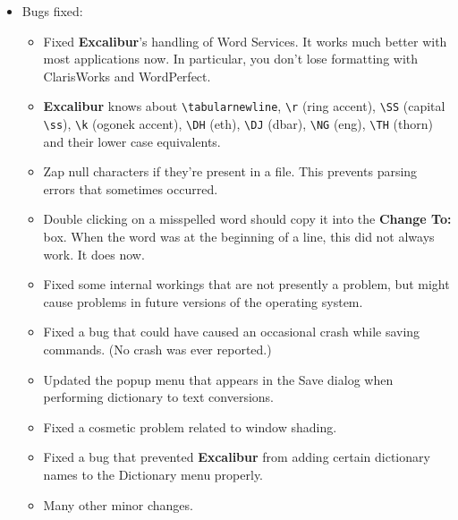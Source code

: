 ﻿\documentclass[11pt,titlepage]{article}
\newcommand{\ex}{\textbf{Excalibur}}
\begin{document}
\begin{itemize}

\item Bugs fixed:

  \begin{itemize}

  \item Fixed \ex's handling of Word Services.  It works much better
    with most applications now.  In particular, you don't lose
    formatting with ClarisWorks and WordPerfect.

  \item \ex{} knows about \verb+\tabularnewline+, \verb+\r+ (ring
    accent), \verb+\SS+ (capital \verb+\ss+), \verb+\k+ (ogonek
    accent), \verb+\DH+ (eth), \verb+\DJ+ (dbar), \verb+\NG+ (eng),
    \verb+\TH+ (thorn) and their lower case equivalents.

  \item Zap null characters if they're present in a file.  This
    prevents parsing errors that sometimes occurred.

  \item Double clicking on a misspelled word should copy it into the
    \textbf{Change To:} box.  When the word was at the beginning of a
    line, this did not always work.  It does now.

  \item Fixed some internal workings that are not presently a problem,
    but might cause problems in future versions of the operating
    system.

  \item Fixed a bug that could have caused an occasional crash while
    saving commands.  (No crash was ever reported.)

  \item Updated the popup menu that appears in the Save dialog when
    performing dictionary to text conversions.

  \item Fixed a cosmetic problem related to window shading.

  \item Fixed a bug that prevented \ex{} from adding certain
    dictionary names to the Dictionary menu properly.

  \item Many other minor changes.

  \end{itemize}

\end{itemize}
\end{document}
